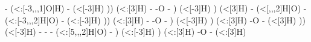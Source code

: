 \begin{struct}
{                                                          -
                                                            (<:[-3,,,1]\textcolor{O}{O}|\textcolor{O}{H})
                                                          -
                                                            (<[-3]H)
                                                        ))
                                                          (<:[3]H)
                                                        -
                                                        -\textcolor{O}{O}
                                                        -
                                                      )
                                                        (<[-3]H)
                                                    )
                                                      (<[3]H)
                                                    -
                                                      (<[,,,2]\textcolor{O}{H}|\textcolor{O}{O})
                                                    -
                                                      (<:[-3,,,2]\textcolor{O}{H}|\textcolor{O}{O})
                                                    -
                                                      (<:[-3]H)
                                                  ))
                                                    (<:[3]H)
                                                  -
                                                  -\textcolor{O}{O}
                                                  -
                                                )
                                                  (<[-3]H)
                                              )
                                              (<:[3]H)
                                            -\textcolor{O}{O}
                                            -
                                              (<[3]H)
                                          ))
                                            (<[-3]H)
                                          -
                                          -
                                          -
                                            (<:[5,,,2]\textcolor{O}{H}|\textcolor{O}{O})
                                          -
                                        )
                                          (<:[-3]H)
                                        )
                                        (<:[3]H)
                                      -\textcolor{O}{O}
                                      -
                                        (<:[3]H)
}
\end{struct}
